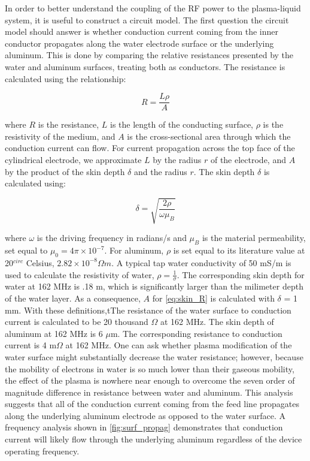 In order to better understand the coupling of the RF power to the plasma-liquid system, it is useful to construct a circuit model. The first question the circuit model should answer is whether conduction current coming from the inner conductor propagates along the water electrode surface or the underlying aluminum. This is done by comparing the relative resistances presented by the water and aluminum surfaces, treating both as conductors. The resistance is calculated using the relationship:

\begin{equation}
  R = \frac{L\rho}{A}
  \label{eq:skin_R}
\end{equation}

where $R$ is the resistance, $L$ is the length of the conducting surface, $\rho$ is the resistivity of the medium, and $A$ is the cross-sectional area through which the conduction current can flow. For current propagation across the top face of the cylindrical electrode, we approximate $L$ by the radius $r$ of the electrode, and $A$ by the product of the skin depth $\delta$ and the radius $r$. The skin depth $\delta$ is calculated using:

\begin{equation}
  \delta = \sqrt{\frac{2\rho}{\omega\mu_B}}
  \label{eq:skin_depth}
\end{equation}

where $\omega$ is the driving frequency in radians/s and $\mu_B$ is the material permeability, set equal to $\mu_0=4\pi\times10^{-7}$. For aluminum, $\rho$ is set equal to its literature value at 20$^{circ}$ Celsius, $2.82\times10^{-8}\Omega m$. A typical tap water conductivity of 50 mS/m is used to calculate the resistivity of water, $\rho = \frac{1}{\sigma}$. The corresponding skin depth for water at 162 MHz is .18 m, which is significantly larger than the milimeter depth of the water layer. As a consequence, $A$ for \cref{eq:skin_R} is calculated with $\delta$ = 1 mm. With these definitions,tThe resistance of the water surface to conduction current is calculated to be 20 thousand $\Omega$ at 162 MHz. The skin depth of aluminum at 162 MHz is 6 $\mu$m. The corresponding resistance to conduction current is 4 m$\Omega$ at 162 MHz. One can ask whether plasma modification of the water surface might substantially decrease the water resistance; however, because the mobility of electrons in water is so much lower than their gaseous mobility, the effect of the plasma is nowhere near enough to overcome the seven order of magnitude difference in resistance between water and aluminum. This analysis suggests that all of the conduction current coming from the feed line propagates along the underlying aluminum electrode as opposed to the water surface. A frequency analysis shown in \cref{fig:surf_propag} demonstrates that conduction current will likely flow through the underlying aluminum regardless of the device operating frequency.

